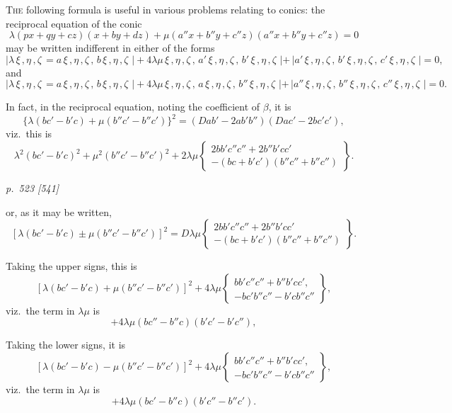 \documentclass[11pt,a4paper]{book}
\begin{document}
\textsc{The} following formula is useful in various problems relating to conics: the reciprocal equation of the conic
\[
\lambda (px + qy + cz)(x + by + dz) + \mu (a''x + b''y + c''z)(a''x + b''y + c''z) = 0
\]
may be written indifferent in either of the forms
\[
|\lambda \, \xi\,, \eta\,, \zeta \, = a \, \xi\,, \eta\,, \zeta \, , \, b \, \xi\,, \eta\,, \zeta \, \, |+ 4 \lambda \mu \, \xi\,, \eta\,, \zeta \, , \, a' \, \xi\,, \eta\,, \zeta \, , \, b' \, \xi\,, \eta\,, \zeta \, \, |+ \, |a' \, \xi\,, \eta\,, \zeta \, , \, b' \, \xi\,, \eta\,, \zeta \, , \, c' \, \xi\,, \eta\,, \zeta \, \, | = 0,
\]
and
\[
|\lambda \, \xi\,, \eta\,, \zeta \, = a \, \xi\,, \eta\,, \zeta \, , \, b \, \xi\,, \eta\,, \zeta \, \, |+ 4 \lambda \mu \, \xi\,, \eta\,, \zeta \, , \, a \, \xi\,, \eta\,, \zeta \, , \, b'' \, \xi\,, \eta\,, \zeta \, \, |+ \, |a'' \, \xi\,, \eta\,, \zeta \, , \, b'' \, \xi\,, \eta\,, \zeta \, , \, c'' \, \xi\,, \eta\,, \zeta \, \, | = 0.
\]

In fact, in the reciprocal equation, noting the coefficient of $\beta$, it is
\[
\{\lambda (bc' - b'c) + \mu (b''c' - b''c')\}^2 = (Dab' - 2ab' b'') (Dac' - 2bc'c'),
\]
viz.\ this is
\[
\lambda^2 (bc' - b'c)^2 + \mu^2 (b''c' - b''c')^2 + 2\lambda\mu \left\{ \begin{array}{l} 2bb'c''c'' + 2b''b'cc' \\ -(bc + b'c')(b''c'' + b''c'') \end{array} \right\}.
\]

\clearpage

\bigskip
\textit{p.~523 [541]}
\smallskip

or, as it may be written,
\[
[\lambda (bc' - b'c) \pm \mu (b''c' - b''c')]^2 = D\lambda\mu \left\{ \begin{array}{l} 2bb'c''c'' + 2b''b'cc' \\ -(bc + b'c')(b''c'' + b''c'') \end{array} \right\}.
\]

Taking the upper signs, this is
\[
[\lambda (bc' - b'c) + \mu (b''c' - b''c')]^2 + 4\lambda\mu \left\{ \begin{array}{l} bb'c''c'' + b''b'cc', \\ -bc'b''c'' - b'cb''c'' \end{array} \right\},
\]
viz.\ the term in $\lambda\mu$ is
\[
+ 4\lambda\mu (bc'' - b''c)(b'c' - b'c''),
\]

Taking the lower signs, it is
\[
[\lambda (bc' - b'c) - \mu (b''c' - b''c')]^2 + 4\lambda\mu \left\{ \begin{array}{l} bb'c''c'' + b''b'cc', \\ -bc'b''c'' - b'cb''c'' \end{array} \right\},
\]
viz.\ the term in $\lambda\mu$ is
\[
+ 4\lambda\mu (bc' - b''c)(b'c'' - b''c').
\]
\end{document}
